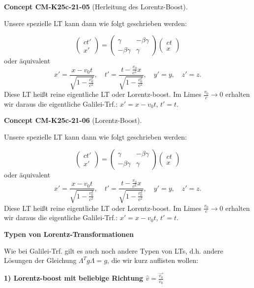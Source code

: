 \documentclass[10pt, letterpaper]{article}
\newcommand{\CustomHeading}[3]{%
  \par\medskip\noindent%
  \textbf{#1 #2} \textnormal{(#3)}.\enskip%
}
\newenvironment{CONC}[2]{\begin{unitbox}\CustomHeading{Concept}{#1}{#2}}{\end{unitbox}}
\begin{document}
\begin{CONC}{CM-K25c-21-05}{Herleitung des Lorentz-Boost}
Unsere spezielle LT kann dann wie folgt geschrieben werden:

\[
\begin{pmatrix} ct' \\ x' \end{pmatrix} = 
\begin{pmatrix}
\gamma & -\beta\gamma \\
-\beta\gamma & \gamma
\end{pmatrix}
\begin{pmatrix} ct \\ x \end{pmatrix}
\]
oder äquivalent
\[
x' = \frac{x-v_0t}{\sqrt{1-\frac{v_0^2}{c^2}}}, \quad t' = \frac{t-\frac{v_0}{c^2}x}{\sqrt{1-\frac{v_0^2}{c^2}}}, \quad y'=y, \quad z'=z.
\]
Diese LT heißt reine eigentliche LT oder Lorentz-boost. Im Limes $\frac{v_0}{c} \to 0$ erhalten wir daraus die eigentliche Galilei-Trf.: $x'=x-v_0t$, $t'=t$.
\end{CONC}

\begin{CONC}{CM-K25c-21-06}{Lorentz-Boost}
Unsere spezielle LT kann dann wie folgt geschrieben werden:

\[
\begin{pmatrix} ct' \\ x' \end{pmatrix} = 
\begin{pmatrix}
\gamma & -\beta\gamma \\
-\beta\gamma & \gamma
\end{pmatrix}
\begin{pmatrix} ct \\ x \end{pmatrix}
\]
oder äquivalent
\[
x' = \frac{x-v_0t}{\sqrt{1-\frac{v_0^2}{c^2}}}, \quad t' = \frac{t-\frac{v_0}{c^2}x}{\sqrt{1-\frac{v_0^2}{c^2}}}, \quad y'=y, \quad z'=z.
\]
Diese LT heißt reine eigentliche LT oder Lorentz-boost. Im Limes $\frac{v_0}{c} \to 0$ erhalten wir daraus die eigentliche Galilei-Trf.: $x'=x-v_0t$, $t'=t$.
\end{CONC}



\textbf{Typen von Lorentz-Transformationen} 

Wie bei Galilei-Trf. gilt es auch noch andere Typen von LTs, d.h. andere Lösungen der Gleichung $\Lambda^T g \Lambda = g$, die wir kurz auflisten wollen:



\textbf{1) Lorentz-boost mit beliebige Richtung $\hat{v}=\frac{\vec{v_0}}{v_0}$}
\end{document}
